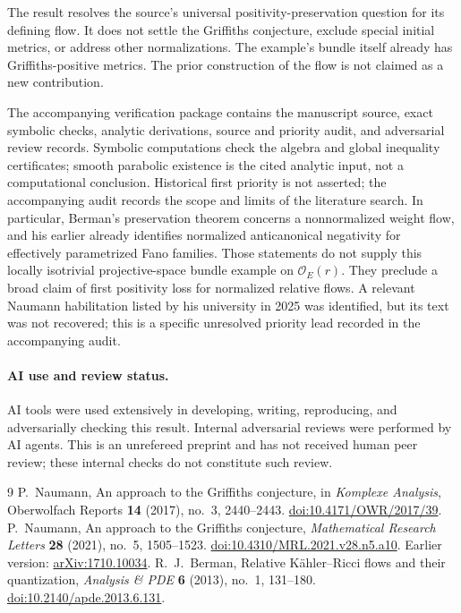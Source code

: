\documentclass[11pt]{article}
\newcommand{\OO}{\mathcal O}
\begin{document}
The result resolves the source's universal positivity-preservation question
for its defining flow. It does not settle the Griffiths conjecture, exclude
special initial metrics, or address other normalizations. The example's
bundle itself already has Griffiths-positive metrics. The prior construction
of the flow is not claimed as a new contribution.

The accompanying verification package contains the manuscript source,
exact symbolic checks, analytic derivations, source and priority audit, and
adversarial review records. Symbolic computations check the algebra and
global inequality certificates; smooth parabolic existence is the cited
analytic input, not a computational conclusion. Historical first priority
is not asserted; the accompanying audit records the scope and limits of
the literature search.
In particular, Berman's preservation theorem concerns a nonnormalized
weight flow, and his earlier \cite[Remark~4.11]{B} already identifies
normalized anticanonical negativity for effectively parametrized Fano
families. Those statements do not supply this locally isotrivial
projective-space bundle example on $\OO_E(r)$. They preclude a broad
claim of first positivity loss for normalized relative flows.
A relevant Naumann habilitation listed by his university in 2025 was
identified, but its text was not recovered; this is a specific unresolved
priority lead recorded in the accompanying audit.

\paragraph{AI use and review status.}
AI tools were used extensively in developing, writing, reproducing, and
adversarially checking this result. Internal adversarial reviews were
performed by AI agents. This is an unrefereed preprint and has not received
human peer review; these internal checks do not constitute such review.

\begin{thebibliography}{9}
 P.~Naumann, An approach to the Griffiths conjecture,
in \emph{Komplexe Analysis}, Oberwolfach Reports \textbf{14} (2017), no.~3,
2440--2443. \href{https://doi.org/10.4171/OWR/2017/39}{doi:10.4171/OWR/2017/39}.
 P.~Naumann, An approach to the Griffiths conjecture,
\emph{Mathematical Research Letters} \textbf{28} (2021), no.~5, 1505--1523.
\href{https://doi.org/10.4310/MRL.2021.v28.n5.a10}{doi:10.4310/MRL.2021.v28.n5.a10}.
Earlier version: \href{https://arxiv.org/abs/1710.10034}{arXiv:1710.10034}.
 R.~J.~Berman, Relative K\"ahler--Ricci flows and their quantization,
\emph{Analysis \& PDE} \textbf{6} (2013), no.~1, 131--180.
\href{https://doi.org/10.2140/apde.2013.6.131}{doi:10.2140/apde.2013.6.131}.
\end{thebibliography}
\end{document}
